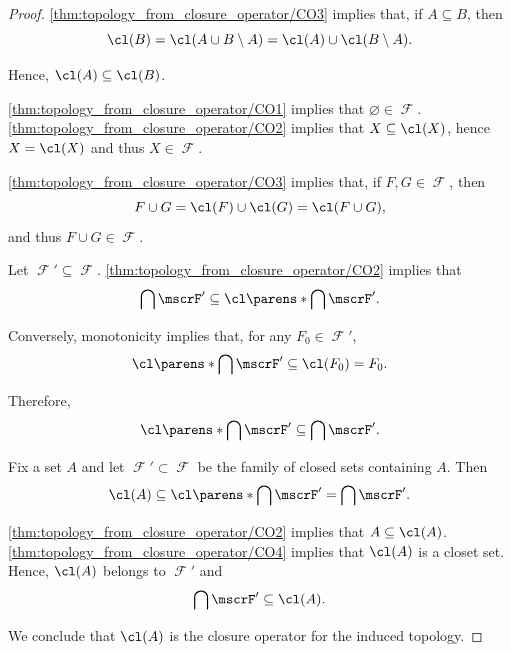 \begin{proof}
   \ref{thm:topology_from_closure_operator/CO3} implies that, if \( A \subseteq B \), then
  \begin{equation*}
    \cl(B) = \cl(A \cup B \setminus A) = \cl(A) \cup \cl(B \setminus A).
  \end{equation*}

  Hence, \( \cl(A) \subseteq \cl(B) \).


   \ref{thm:topology_from_closure_operator/CO1} implies that \( \varnothing \in \mscrF \). \ref{thm:topology_from_closure_operator/CO2} implies that \( X \subseteq \cl(X) \), hence \( X = \cl(X) \) and thus \( X \in \mscrF \).

   \ref{thm:topology_from_closure_operator/CO3} implies that, if \( F, G \in \mscrF \), then
  \begin{equation*}
    F \cup G = \cl(F) \cup \cl(G) = \cl(F \cup G),
  \end{equation*}
  and thus \( F \cup G \in \mscrF \).

   Let \( \mscrF' \subseteq \mscrF \). \ref{thm:topology_from_closure_operator/CO2} implies that
  \begin{equation*}
    \bigcap \mscrF' \subseteq \cl\parens*{ \bigcap \mscrF' }.
  \end{equation*}

  Conversely, monotonicity implies that, for any \( F_0 \in \mscrF' \),
  \begin{equation*}
    \cl\parens*{ \bigcap \mscrF' }
    \subseteq
    \cl(F_0)
    =
    F_0.
  \end{equation*}

  Therefore,
  \begin{equation*}
    \cl\parens*{ \bigcap \mscrF' } \subseteq \bigcap \mscrF'.
  \end{equation*}

   Fix a set \( A \) and let \( \mscrF' \subset \mscrF \) be the family of closed sets containing \( A \). Then
  \begin{equation*}
    \cl(A) \subseteq \cl\parens*{ \bigcap \mscrF' } = \bigcap \mscrF'.
  \end{equation*}

  \ref{thm:topology_from_closure_operator/CO2} implies that \( A \subseteq \cl(A) \). \ref{thm:topology_from_closure_operator/CO4} implies that \( \cl(A) \) is a closet set. Hence, \( \cl(A) \) belongs to \( \mscrF' \) and
  \begin{equation*}
    \bigcap \mscrF' \subseteq \cl(A).
  \end{equation*}

  We conclude that \( \cl(A) \) is the closure operator for the induced topology.
\end{proof}

